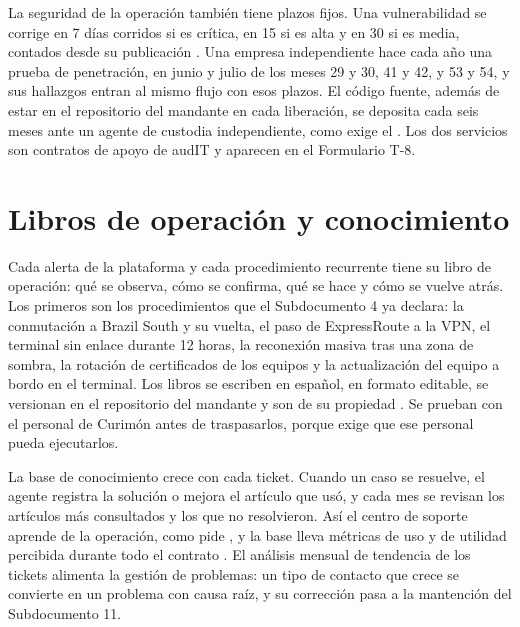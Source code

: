 La seguridad de la operación también tiene plazos fijos. Una vulnerabilidad se corrige en 7 días
corridos si es crítica, en 15 si es alta y en 30 si es media, contados desde su publicación
. Una empresa independiente hace cada año una prueba de penetración, en junio y julio de
los meses 29 y 30, 41 y 42, y 53 y 54, y sus hallazgos entran al mismo flujo con esos plazos. El código
fuente, además de estar en el repositorio del mandante en cada liberación, se deposita cada seis meses
ante un agente de custodia independiente, como exige el . Los dos servicios son contratos
de apoyo de audIT y aparecen en el Formulario T-8.

\section{Libros de operación y conocimiento}\label{sec:10-libros-de-operacion-y-conocimien}

Cada alerta de la plataforma y cada procedimiento recurrente tiene su libro de operación: qué se
observa, cómo se confirma, qué se hace y cómo se vuelve atrás. Los primeros son los procedimientos que
el Subdocumento 4 ya declara: la conmutación a Brazil South y su vuelta, el paso de ExpressRoute a la
VPN, el terminal sin enlace durante 12 horas, la reconexión masiva tras una zona de sombra, la rotación
de certificados de los equipos y la actualización del equipo a bordo en el terminal. Los libros se
escriben en español, en formato editable, se versionan en el repositorio del mandante y son de su
propiedad . Se prueban con el personal de Curimón antes de traspasarlos, porque
 exige que ese personal pueda ejecutarlos.

La base de conocimiento crece con cada ticket. Cuando un caso se resuelve, el agente registra la solución
o mejora el artículo que usó, y cada mes se revisan los artículos más consultados y los que no
resolvieron. Así el centro de soporte aprende de la operación, como pide , y la
base lleva métricas de uso y de utilidad percibida durante todo el contrato . El
análisis mensual de tendencia de los tickets alimenta la gestión de problemas: un tipo de contacto que
crece se convierte en un problema con causa raíz, y su corrección pasa a la mantención del
Subdocumento 11.

